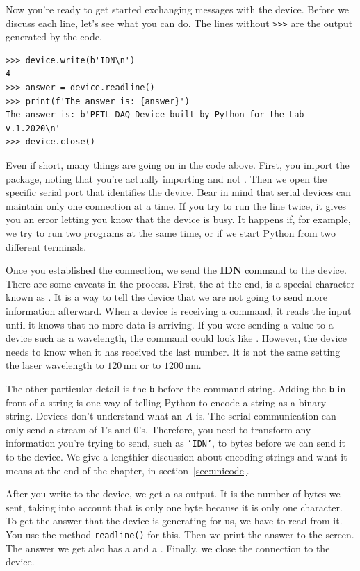 Now you're ready to get started exchanging messages with the device. Before we discuss each line, let's see what you can do. The lines without \texttt{>>>} are the output generated by the code.

\begin{verbatim}
>>> device.write(b'IDN\n')
4
>>> answer = device.readline()
>>> print(f'The answer is: {answer}')
The answer is: b'PFTL DAQ Device built by Python for the Lab v.1.2020\n'
>>> device.close()
\end{verbatim}

Even if short, many things are going on in the code above. First, you import the  package, noting that you're actually importing  and not . Then we open the specific serial port that identifies the device. Bear in mind that serial devices can maintain only one connection at a time. If you try to run the line twice, it gives you an error letting you know that the device is busy. It happens if, for example, we try to run two programs at the same time, or if we start Python from two different terminals.

Once you established the connection, we send the \textbf{{IDN}} command to the device. There are some caveats in the process. First, the \texttt{\n} at the end, is a special character known as . It is a way to tell the device that we are
not going to send more information afterward. When a device is receiving a command, it reads the input until it knows that no more data is arriving. If you were sending a value to a device such as a wavelength, the command could look like . However, the device needs to know when it has received the last number. It is not the same setting the laser wavelength to $120\,\textrm{nm}$ or to $1200\,\textrm{nm}$.

The other particular detail is the \texttt{b} before the command string. Adding the \texttt{b} in front of a string is one way of telling Python to encode a string as a binary string. Devices don't understand what an \textit{A} is. The serial communication can only send a stream of 1's and 0's. Therefore, you need to transform any information you're trying to send, such as \texttt{'IDN'}, to bytes before we can send it to the device. We give a lengthier discussion about encoding strings and what it means at the end of the chapter, in section~\ref{sec:unicode}.

After you write to the device, we get a  as output. It is the number of bytes we sent, taking into account that \texttt{\n} is only one byte because it is only one character. To get the answer that the device is generating for us, we have to read from it. You use the method \texttt{readline()} for this. Then we print the answer to the screen. The answer we get also has a \py{\n} and a . Finally, we close the connection to the device.


